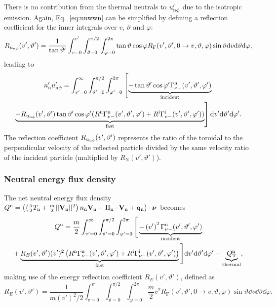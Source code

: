 There is no contribution from the thermal neutrals to $u_{\mathrm{n}\phi}'$ due to the isotropic emission. Again, Eq.~\eqref{eq:nnwwn} can be simplified by defining a reflection coefficient for the inner integrals over $v$, $\vartheta$ and $\varphi$:
\begin{equation}
R_{u_{\mathrm{n}\phi}}(v',\vartheta') = \frac{1}{\tan \vartheta'} \int_{v=0}^{v'}\int_{\vartheta=0}^{\pi/2} \int_{\varphi=0}^{2\pi} \tan \vartheta \cos \varphi R_{\mathrm{F}}(v',\vartheta',0 \rightarrow v,\vartheta,\varphi) \sin \vartheta \mathrm{d} v \mathrm{d} \vartheta \mathrm{d} \varphi, \label{eq:Rwwn}
\end{equation}
leading to
\begin{multline}
n_{\mathrm{n}}'u_{\mathrm{n}\phi}' = \int_{v'=0}^{\infty} \int_{\vartheta'=0}^{\pi/2} \int_{\varphi'=0}^{2\pi} \left [ \underbrace{-\tan \vartheta' \cos\varphi' \Gamma_{\nu-}^{\mathrm{n}}(v',\vartheta',\varphi')}_{\text{incident}} \right. \\
\left. \underbrace{- R_{u_{\mathrm{n}\phi}}(v',\vartheta') \tan \vartheta' \cos \varphi' (R^{\mathrm{n}} \Gamma_{\nu-}^{\mathrm{n}}(v',\vartheta',\varphi') + R^{\mathrm{i}} \Gamma_{\nu-}^{\mathrm{i}}(v',\vartheta',\varphi'))}_{\text{fast}} \right ] \mathrm{d} v' \mathrm{d} \vartheta' \mathrm{d} \varphi'. \label{eq:wwnboundary}
\end{multline}
The reflection coefficient $R_{u_{\mathrm{n}\phi}}(v',\vartheta')$ represents the ratio of the toroidal to the perpendicular velocity of the reflected particle divided by the same velocity ratio of the incident particle (multiplied by $R_{\mathrm{N}}(v',\vartheta')$).

\subsubsection{Neutral energy flux density}

The net neutral energy flux density $Q^{\mathrm{n}} = \left( \left( \frac{5}{2} T_{\mathrm{n}} + \frac{m}{2} ||{\bf V}_{\mathrm{n}}||^{2} \right) n_{\mathrm{n}} {\bf V}_{\mathrm{n}} + \Pi_{\mathrm{n}} \cdot {\bf V}_{\mathrm{n}} + {\bf q}_{\mathrm{n}} \right) \cdot {\boldsymbol \nu}_{}$ becomes
\begin{multline}
Q^{\mathrm{n}} = \frac{m}{2} \int_{v'=0}^{\infty} \int_{\vartheta'=0}^{\pi/2} \int_{\varphi'=0}^{2\pi} \Bigg [ \underbrace{-\left ( v' \right )^{2} \Gamma_{\nu-}^{\mathrm{n}}(v',\vartheta',\varphi')}_{\text{incident}}\\
+ \underbrace{R_{E}(v',\vartheta') (v')^{2} \left( R^{\mathrm{n}} \Gamma_{\nu-}^{\mathrm{n}}(v',\vartheta',\varphi') + R^{\mathrm{i}} \Gamma_{\nu-}^{\mathrm{i}}(v',\vartheta',\varphi') \right)}_{\text{fast}}\Bigg ] \mathrm{d} v' \mathrm{d} \vartheta' \mathrm{d} \varphi' + \underbrace{Q_{\mathrm{T}}^{\mathrm{n}}}_{\text{thermal}}, \label{eq:Qnboundary}
\end{multline}
making use of the energy reflection coefficient $R_{E}(v',\vartheta')$, defined as
\begin{equation}
R_{E}(v',\vartheta') = \frac{1}{m\left (v'\right )^{2}/2} \int_{v=0}^{v'} \int_{\vartheta=0}^{\pi/2} \int_{\varphi=0}^{2\pi} \frac{m}{2} v^{2} R_{\mathrm{F}}(v',\vartheta',0 \rightarrow v,\vartheta, \varphi) \sin \vartheta \dd v \dd \vartheta \dd \varphi. \label{eq:RE}
\end{equation}

